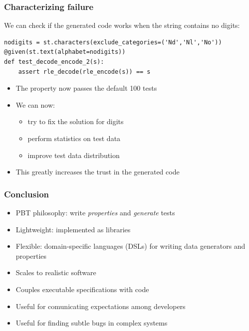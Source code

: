 \documentclass{beamer}
\begin{document}
\begin{frame}[fragile]
  \frametitle{Characterizing failure}

  We can check if the generated code
  works when the string contains no digits:
\begin{verbatim}
nodigits = st.characters(exclude_categories=('Nd','Nl','No'))
@given(st.text(alphabet=nodigits))
def test_decode_encode_2(s):
    assert rle_decode(rle_encode(s)) == s
\end{verbatim}

  \begin{itemize}
  \item The property now passes the default 100 tests
  \item We can now:
    \begin{itemize}
    \item try to fix the solution for digits 
    \item perform statistics on test data
    \item improve test data distribution
    \end{itemize}
  \item This greatly increases the trust in the generated code
  \end{itemize}
\end{frame}



\begin{frame}[allowframebreaks]
  \frametitle{Conclusion}

\begin{itemize}
\item PBT philosophy: write \emph{properties} and \emph{generate} tests
\item Lightweight: implemented as libraries
\item Flexible: domain-specific languages (DSLs) for writing
    data generators and properties
 \item Scales to realistic software
    
\item Couples executable specifications with code
\item Useful for comunicating expectations among developers
\item Useful for finding subtle bugs in complex systems 
\end{itemize}
\end{frame}
\end{document}
